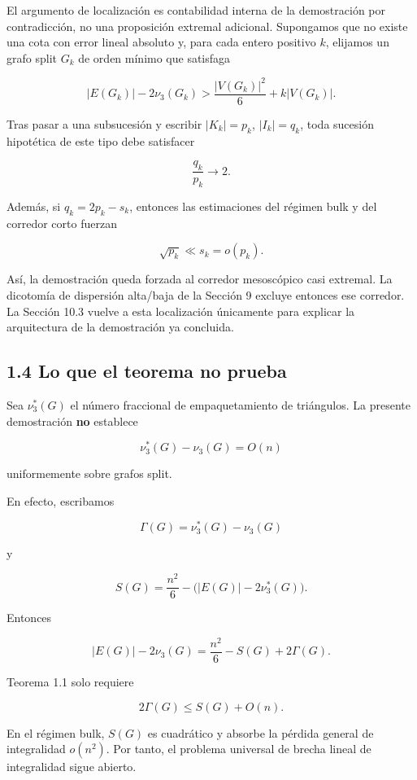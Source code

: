 \documentclass[spanish,11pt,a4paper]{article}
\begin{document}
El argumento de localización es contabilidad interna de la demostración
por contradicción, no una proposición extremal adicional. Supongamos que
no existe una cota con error lineal absoluto y, para cada entero
positivo \(k\), elijamos un grafo split \(G_k\) de orden mínimo que
satisfaga

\[
|E(G_k)|-2\nu_3(G_k)>\frac{|V(G_k)|^2}{6}+k|V(G_k)|.
\]

Tras pasar a una subsucesión y escribir \(|K_k|=p_k\), \(|I_k|=q_k\),
toda sucesión hipotética de este tipo debe satisfacer

\[
\frac{q_k}{p_k}\longrightarrow 2.
\]

Además, si \(q_k=2p_k-s_k\), entonces las estimaciones del régimen bulk
y del corredor corto fuerzan

\[
\sqrt{p_k}\ll s_k=o(p_k).
\]

Así, la demostración queda forzada al corredor mesoscópico casi
extremal. La dicotomía de dispersión alta/baja de la Sección 9 excluye
entonces ese corredor. La Sección 10.3 vuelve a esta localización
únicamente para explicar la arquitectura de la demostración ya
concluida.

\subsection{1.4 Lo que el teorema no
prueba}\label{lo-que-el-teorema-no-prueba}

Sea \(\nu_3^*(G)\) el número fraccional de empaquetamiento de
triángulos. La presente demostración \textbf{no} establece

\[
\nu_3^*(G)-\nu_3(G)=O(n)
\tag{1.4}
\]

uniformemente sobre grafos split.

En efecto, escribamos

\[
\Gamma(G)=\nu_3^*(G)-\nu_3(G)
\]

y

\[
S(G)=\frac{n^2}{6}-\bigl(|E(G)|-2\nu_3^*(G)\bigr).
\]

Entonces

\[
|E(G)|-2\nu_3(G)
=
\frac{n^2}{6}-S(G)+2\Gamma(G).
\tag{1.5}
\]

Teorema 1.1 solo requiere

\[
2\Gamma(G)\le S(G)+O(n).
\]

En el régimen bulk, \(S(G)\) es cuadrático y absorbe la pérdida general
de integralidad \(o(n^2)\). Por tanto, el problema universal de brecha
lineal de integralidad sigue abierto.
\end{document}
